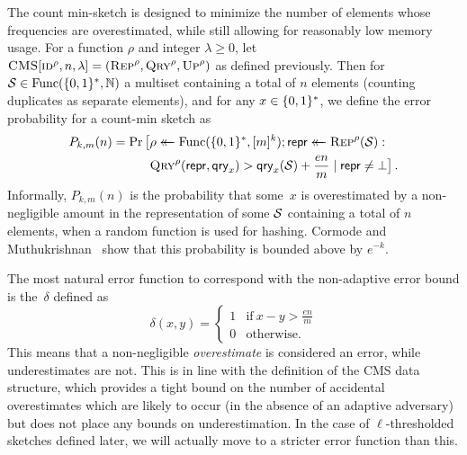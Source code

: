 %
The count min-sketch is designed to minimize the number of elements whose
frequencies are overestimated, while still allowing for reasonably low memory
usage. For a function $\rho$ and integer $\lambda\ge0$, let
$\textnormal{\textsc{CMS}}[\textnormal{\textsc{id}}^\rho,n,\lambda] = (\textnormal{\textsc{Rep}}^\rho,\textnormal{\textsc{Qry}}^\rho,\textnormal{\textsc{Up}}^\rho)$ as defined
previously. Then for $\mathcal{S} \in \mathrm{Func}(\{0,1\}^*,\mathbb{N})$  a multiset containing a total
of $n$ elements (counting duplicates as separate elements), and for any
$x \in \{0,1\}^*$, we define the error probability for a count-min sketch as
\begin{equation}\label{eq:bf-fp}
  \begin{aligned}
    P_{k,m}(n) =
      \Pr\big[&\rho \mathrel{\leftarrow\mkern-14mu\leftarrow} \mathrm{Func}(\{0,1\}^*,[m]^k);
              \mathsf{repr} \mathrel{\leftarrow\mkern-14mu\leftarrow} \textnormal{\textsc{Rep}}^\rho(\mathcal{S}): \\
              &\textnormal{\textsc{Qry}}^\rho(\mathsf{repr}, \mathsf{qry}_x) > \mathsf{qry}_x(\mathcal{S})+\frac{en}{m} \mid \mathsf{repr} \ne \bot
      \big] \,.
  \end{aligned}
\end{equation}
%
%
Informally, $P_{k,m}(n)$ is the probability that some~$x$ is overestimated by a
non-negligible amount in the representation of some $\mathcal{S}$ containing a total
of $n$ elements, when a random function is used for hashing. Cormode and
Muthukrishnan~\cite{cormode2005improved} show that this probability is bounded
above by $e^{-k}$.

%
%
The most natural error function to correspond with the non-adaptive error bound
is the~$\delta$ defined as
\begin{equation}
  \delta(x, y) =
  \begin{cases}
    1 & \text{if}\ x - y > \frac{en}{m} \\
    0 & \text{otherwise.}
  \end{cases}
\end{equation}
%
%
This means that a non-negligible \emph{overestimate} is considered an error,
while underestimates are not. This is in line with the definition of the CMS
data structure, which provides a tight bound on the number of accidental
overestimates which are likely to occur (in the absence of an adaptive
adversary) but does not place any bounds on underestimation. In the case of
$\ell$-thresholded sketches defined later, we will actually move to a stricter
error function than this.


